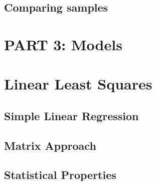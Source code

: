 \documentclass[
  openany]{book}
\theoremstyle{definition}
\theoremstyle{definition}
\theoremstyle{definition}
\theoremstyle{definition}
\theoremstyle{remark}
\begin{document}
\section{Comparing samples}\label{comparing-samples}

\chapter*{PART 3: Models}\label{part-3-models}


\chapter{Linear Least Squares}\label{linear-least-squares}

\section{Simple Linear Regression}\label{simple-linear-regression}

\section{Matrix Approach}\label{matrix-approach}

\section{Statistical Properties}\label{statistical-properties}
\end{document}
